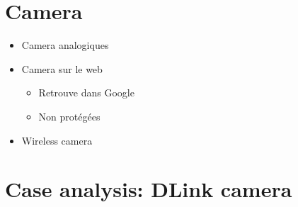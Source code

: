 
\chapter{Camera}

\begin{itemize}
\item Camera analogiques
\item Camera sur le web
  \begin{itemize}
  \item Retrouve dans Google
  \item Non protégées
  \end{itemize}
\item Wireless camera
\end{itemize}

\chapter{Case analysis: DLink camera}

